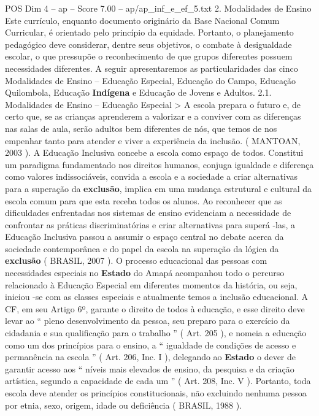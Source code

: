 \begin{textsample}{POS Dim 4 – ap – Score 7.00 – ap/ap\_inf\_e\_ef\_5.txt}  \label{ex:f4_pos_239}
2.
Modalidades de Ensino Este currículo, enquanto documento originário da Base Nacional Comum Curricular, é orientado pelo princípio da equidade.
Portanto, o planejamento pedagógico deve considerar, dentre seus objetivos, o combate à desigualdade escolar, o que pressupõe o reconhecimento de que grupos diferentes possuem necessidades diferentes.
A seguir apresentaremos as particularidades das cinco Modalidades de Ensino – Educação Especial, Educação do Campo, Educação Quilombola, Educação \textbf{Indígena} e Educação de Jovens e Adultos. 2.1.
Modalidades de Ensino – Educação Especial > A escola prepara o futuro e, de certo que, se as crianças aprenderem a valorizar e a conviver com as diferenças nas salas de aula, serão adultos bem diferentes de nós, que temos de nos empenhar tanto para atender e viver a experiência da inclusão. ( MANTOAN, 2003 ).
A Educação Inclusiva concebe a escola como espaço de todos.
Constitui um paradigma fundamentado nos direitos humanos, conjuga igualdade e diferença como valores indissociáveis, convida a escola e a sociedade a criar alternativas para a superação da \textbf{exclusão}, implica em uma mudança estrutural e cultural da escola comum para que esta receba todos os alunos.
Ao reconhecer que as dificuldades enfrentadas nos sistemas de ensino evidenciam a necessidade de confrontar as práticas discriminatórias e criar alternativas para superá -las, a Educação Inclusiva passou a assumir o espaço central no debate acerca da sociedade contemporânea e do papel da escola na superação da lógica da \textbf{exclusão} ( BRASIL, 2007 ).
O processo educacional das pessoas com necessidades especiais no \textbf{Estado} do Amapá acompanhou todo o percurso relacionado à Educação Especial em diferentes momentos da história, ou seja, iniciou -se com as classes especiais e atualmente temos a inclusão educacional.
A CF, em seu Artigo 6º, garante o direito de todos à educação, e esse direito deve levar ao “ pleno desenvolvimento da pessoa, seu preparo para o exercício da cidadania e sua qualificação para o trabalho ” ( Art. 205 ), e nomeia a educação como um dos princípios para o ensino, a “ igualdade de condições de acesso e permanência na escola ” ( Art. 206, Inc.
I ), delegando ao \textbf{Estado} o dever de garantir acesso aos “ níveis mais elevados de ensino, da pesquisa e da criação artística, segundo a capacidade de cada um ” ( Art. 208, Inc.
V ).
Portanto, toda escola deve atender os princípios constitucionais, não excluindo nenhuma pessoa por etnia, sexo, origem, idade ou deficiência ( BRASIL, 1988 ).

\end{textsample}
